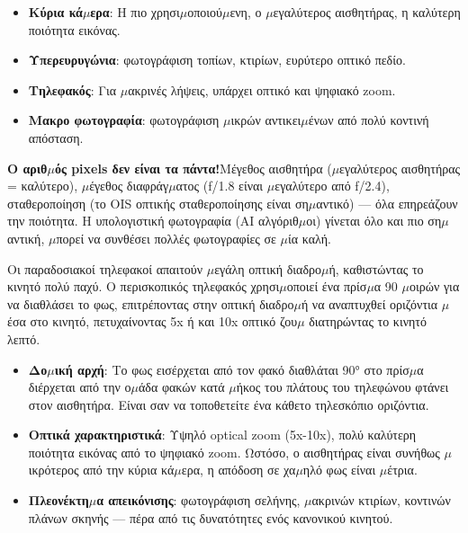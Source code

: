 \begin{itemize}
  \item \textbf{Κύρια κά$\mu$ερα}: Η πιο χρησι$\mu$οποιού$\mu$ενη, ο $\mu$εγαλύτερος αισθητήρας, η καλύτερη ποιότητα εικόνας.
  \item \textbf{Υπερευρυγώνια}: φωτογράφιση τοπίων, κτιρίων, ευρύτερο οπτικό πεδίο.
  \item \textbf{Τηλεφακός}: Για $\mu$ακρινές λήψεις, υπάρχει οπτικό και ψηφιακό zoom.
  \item \textbf{Μακρο φωτογραφία}: φωτογράφιση $\mu$ικρών αντικει$\mu$ένων από πολύ κοντινή απόσταση.
\end{itemize}

\textbf{Ο αριθ$\mu$ός pixels δεν είναι τα πάντα!}Μέγεθος αισθητήρα ($\mu$εγαλύτερος αισθητήρας = καλύτερο), $\mu$έγεθος διαφράγ$\mu$ατος (f/1.8 είναι $\mu$εγαλύτερο από f/2.4), σταθεροποίηση (το OIS οπτικής σταθεροποίησης είναι ση$\mu$αντικό) — όλα επηρεάζουν την ποιότητα. Η υπολογιστική φωτογραφία (AI αλγόριθ$\mu$οι) γίνεται όλο και πιο ση$\mu$αντική, $\mu$πορεί να συνθέσει πολλές φωτογραφίες σε $\mu$ία καλή.


Οι παραδοσιακοί τηλεφακοί απαιτούν $\mu$εγάλη οπτική διαδρο$\mu$ή, καθιστώντας το κινητό πολύ παχύ. Ο περισκοπικός τηλεφακός χρησι$\mu$οποιεί ένα πρίσ$\mu$α 90 $\mu$οιρών για να διαθλάσει το φως, επιτρέποντας στην οπτική διαδρο$\mu$ή να αναπτυχθεί οριζόντια $\mu$έσα στο κινητό, πετυχαίνοντας 5x ή και 10x οπτικό ζου$\mu$ διατηρώντας το κινητό λεπτό.

\begin{itemize}
  \item \textbf{Δο$\mu$ική αρχή}: Το φως εισέρχεται από τον φακό διαθλάται 90° στο πρίσ$\mu$α διέρχεται από την ο$\mu$άδα φακών κατά $\mu$ήκος του πλάτους του τηλεφώνου φτάνει στον αισθητήρα. Είναι σαν να τοποθετείτε ένα κάθετο τηλεσκόπιο οριζόντια.
  \item \textbf{Οπτικά χαρακτηριστικά}: Υψηλό optical zoom (5x-10x), πολύ καλύτερη ποιότητα εικόνας από το ψηφιακό zoom. Ωστόσο, ο αισθητήρας είναι συνήθως $\mu$ικρότερος από την κύρια κά$\mu$ερα, η απόδοση σε χα$\mu$ηλό φως είναι $\mu$έτρια.
  \item \textbf{Πλεονέκτη$\mu$α απεικόνισης}: φωτογράφιση σελήνης, $\mu$ακρινών κτιρίων, κοντινών πλάνων σκηνής — πέρα από τις δυνατότητες ενός κανονικού κινητού.
\end{itemize}


